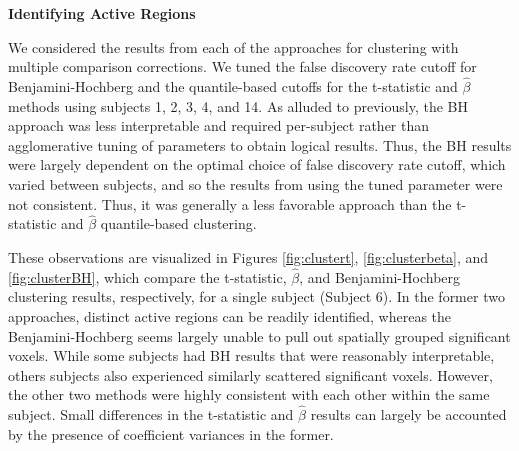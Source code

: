\noindent \textbf{Identifying Active Regions}

We considered the results from each of the approaches for clustering with 
multiple comparison corrections. We tuned the false discovery rate cutoff for 
Benjamini-Hochberg and the quantile-based cutoffs for the t-statistic and 
$\hat{\beta}$ methods using subjects 1, 2, 3, 4, and 14. As alluded to 
previously, the BH approach was less interpretable and required per-subject 
rather than agglomerative tuning of parameters to obtain logical results. 
Thus, the BH results were largely dependent on the optimal choice of false 
discovery rate cutoff, which varied between subjects, and so the results from 
using the tuned parameter were not consistent. Thus, it was generally a less 
favorable approach than the t-statistic and $\hat{\beta}$ quantile-based 
clustering. 

These observations are visualized in Figures \ref{fig:clustert}, 
\ref{fig:clusterbeta}, and \ref{fig:clusterBH}, which compare the t-statistic, 
$\hat{\beta}$, and Benjamini-Hochberg clustering results, respectively, for a 
single subject (Subject 6). In the former two approaches, distinct active 
regions can be readily identified, whereas the Benjamini-Hochberg seems 
largely unable to pull out spatially grouped significant voxels. While some 
subjects had BH results that were reasonably interpretable, others subjects 
also experienced similarly scattered significant voxels. However, the other 
two methods were highly consistent with each other within the same subject. 
Small differences in the t-statistic and $\hat{\beta}$ results can largely be 
accounted by the presence of coefficient variances in the former. 

